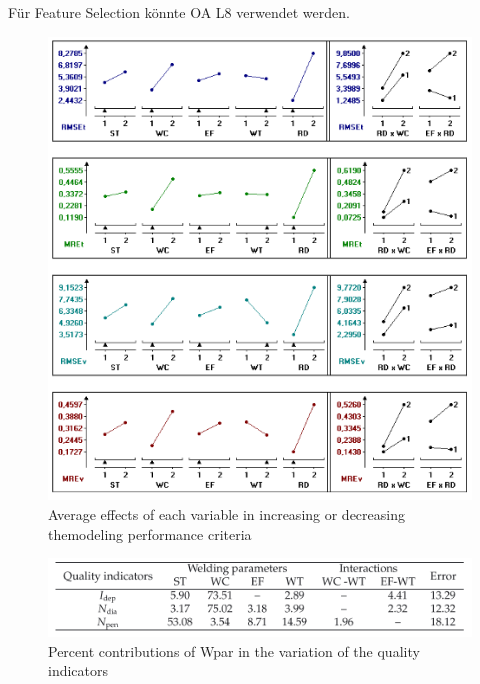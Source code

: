 \documentclass[english,ngerman]{tudscrreprt}
\begin{document}
Für Feature Selection könnte OA L8 verwendet werden.
\begin{figure}[H]
\centering
\includegraphics{./Bilder/Average effects of each variable in increasing or decreasing themodeling performance criteria.png}
\caption{Average effects of each variable in increasing or decreasing themodeling performance criteria}\label{fgg:AONVA3}
\end{figure}
\begin{figure}[H]
\centering
\includegraphics{./Bilder/Percent contributions of Wpar in the variation of the quality indicators.png}
\caption{Percent contributions of Wpar in the variation of the quality indicators}\label{fgg:AONVA4}
\end{figure}
\end{document}
